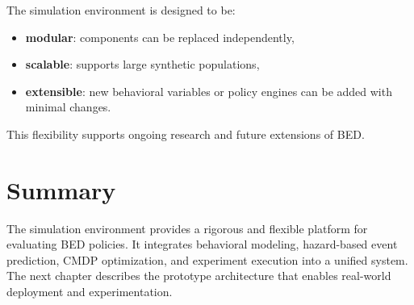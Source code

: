 The simulation environment is designed to be:

\begin{itemize}
    \item \textbf{modular}: components can be replaced independently,
    \item \textbf{scalable}: supports large synthetic populations,
    \item \textbf{extensible}: new behavioral variables or policy engines can be
    added with minimal changes.
\end{itemize}

This flexibility supports ongoing research and future extensions of BED.

\section{Summary}

The simulation environment provides a rigorous and flexible platform for
evaluating BED policies. It integrates behavioral modeling, hazard-based event
prediction, CMDP optimization, and experiment execution into a unified system.
The next chapter describes the prototype architecture that enables real-world
deployment and experimentation.
